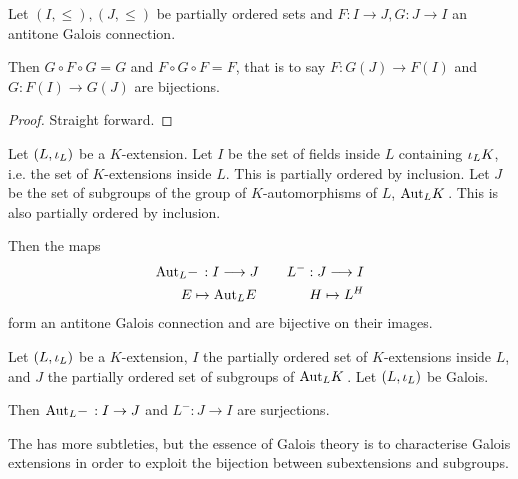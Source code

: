 \documentclass[main.tex]{subfiles}
\begin{document}
\begin{thm} 

  Let $(I,\leq), (J,\leq)$ be partially ordered sets and 
  $F : I \to J, G : J \to I$ an antitone Galois connection.

  Then $G \circ F \circ G = G$ and $F \circ G \circ F = F$, 
  that is to say $F : G(J) \to F(I)$ and $G : F(I) \to G(J)$ are bijections. 
\end{thm}
\begin{proof}
  Straight forward. 
\end{proof}

\begin{cor}  
  
  Let $(L,\io_L)$ be a $K$-extension. 
  Let $I$ be the set of fields inside $L$ containing $\io_L K$, 
  i.e. the set of $K$-extensions inside $L$. 
  This is partially ordered by inclusion. 
  Let $J$ be the set of subgroups of 
  the group of $K$-automorphisms of $L$, $\aut{K}{L}$. 
  This is also partially ordered by inclusion. 

  Then the maps \begin{alignat*}{3}
    \aut{-}{L} : I \longrightarrow J &&\quad L^- : J \longrightarrow I \\
    E \mapsto \aut{E}{L} &&\quad H \mapsto L^H
  \end{alignat*}
  form an antitone Galois connection and are bijective on their images. 
\end{cor}

\begin{thm}  

  Let $(L,\io_L)$ be a $K$-extension,
  $I$ the partially ordered set of $K$-extensions inside $L$, 
  and $J$ the partially ordered set of subgroups of $\aut{K}{L}$. 
  Let $(L,\io_L)$ be Galois. 

  Then $\aut{-}{L} : I \to J$ and $L^{-} : J \to I$ are surjections. 
\end{thm}

\begin{rmk}
  The  has more subtleties, 
  but the essence of Galois theory is to characterise Galois extensions 
  in order to exploit the bijection between subextensions and subgroups. 
\end{rmk}
\end{document}
